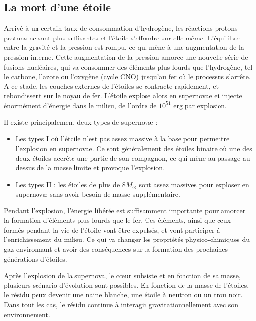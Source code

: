 \subsection{La mort d'une étoile}
\label{sec:snmort}

Arrivé à un certain taux de consommation d'hydrogène, les réactions protons-protons ne sont plus suffisantes et l'étoile s'effondre sur elle même.
L'équilibre entre la gravité et la pression est rompu, ce qui mène à une augmentation de la pression interne.
Cette augmentation de la pression amorce une nouvelle série de fusions nucléaires, qui va consommer des éléments plus lourds que l’hydrogène, tel le carbone, l'azote ou l'oxygène (cycle CNO) jusqu'au fer où le processus s'arrête.
A ce stade, les couches externes de l'étoiles se contracte rapidement, et rebondissent sur le noyau de fer.
L'étoile explose alors en supernovae et injecte énormément d'énergie dans le milieu, de l'ordre de $10^{51}$ erg par explosion. 

Il existe principalement deux types de supernovæ : 
\begin{itemize}
\item Les types I où l'étoile n'est pas assez massive à la base pour permettre l'explosion en supernovae.
Ce sont généralement des étoiles binaire où une des deux étoiles accrète une partie de son compagnon, ce qui mène au passage au dessus de la masse limite et provoque l'explosion.
\item Les types II : les étoiles de plus de 8$M_\odot$ sont assez massives pour exploser en supernovæ sans avoir besoin de masse supplémentaire.
\end{itemize}

Pendant l'explosion, l'énergie libérée est suffisamment importante pour amorcer la formation d'éléments plus lourds que le fer.
Ces éléments, ainsi que ceux formés pendant la vie de l'étoile vont être expulsés, et vont participer à l'enrichissement du milieu.
Ce qui va changer les propriétés physico-chimiques du gaz environnant et avoir des conséquences sur la formation des prochaines générations d'étoiles.

Après l'explosion de la supernova, le cœur subsiste et en fonction de sa masse, plusieurs scénario d'évolution sont possibles.
En fonction de la masse de l'étoiles, le résidu peux devenir une naine blanche, une étoile à neutron ou un trou noir.
Dans tout les cas, le résidu continue à interagir gravitationnellement avec son environnement.

